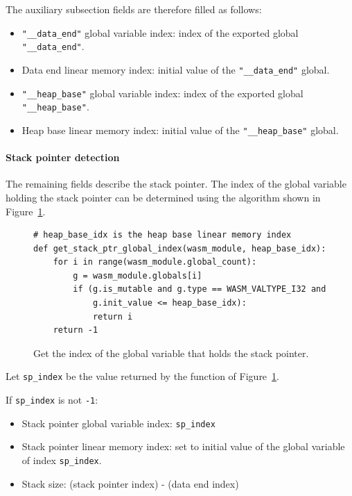 \documentclass{article}
\begin{document}
The auxiliary subsection fields are therefore filled as follows:

\begin{itemize}
\item \verb|"__data_end"| global variable index: index of the exported global \verb|"__data_end"|.
\item Data end linear memory index: initial value of the \verb|"__data_end"| global.
\item \verb|"__heap_base"| global variable index: index of the exported global \verb|"__heap_base"|.
\item Heap base linear memory index: initial value of the \verb|"__heap_base"| global.
\end{itemize}

\paragraph{Stack pointer detection}

The remaining fields describe the stack pointer. The index of the global variable holding the stack pointer can be determined using the algorithm shown in Figure~\ref{figure:get-stack-ptr-global-index}.

\begin{figure}[H]
\begin{verbatim}
# heap_base_idx is the heap base linear memory index
def get_stack_ptr_global_index(wasm_module, heap_base_idx):
    for i in range(wasm_module.global_count):
        g = wasm_module.globals[i]
        if (g.is_mutable and g.type == WASM_VALTYPE_I32 and
            g.init_value <= heap_base_idx):
            return i
    return -1
\end{verbatim}
\caption{Get the index of the global variable that holds the stack pointer.}
\label{figure:get-stack-ptr-global-index}
\end{figure}

Let \verb|sp_index| be the value returned by the function of Figure~\ref{figure:get-stack-ptr-global-index}.

If \verb|sp_index| is not \verb|-1|:

\begin{itemize}
\item Stack pointer global variable index: \verb|sp_index|
\item Stack pointer linear memory index: set to initial value of the global
variable of index \verb|sp_index|.
\item Stack size: (stack pointer index) - (data end index)
\end{itemize}
\end{document}
